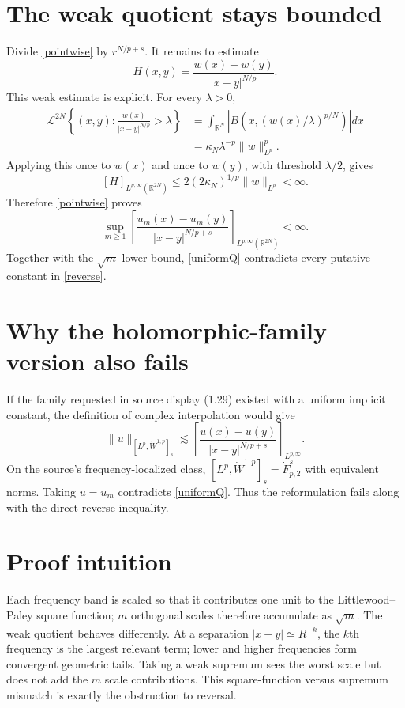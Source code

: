 \documentclass[11pt]{article}
\newcommand{\R}{\mathbb R}
\begin{document}
\section*{The weak quotient stays bounded}
Divide \eqref{pointwise} by $r^{N/p+s}$.  It remains to estimate
\[
 H(x,y)=\frac{w(x)+w(y)}{|x-y|^{N/p}}.
\]
This weak estimate is explicit.  For every $\lambda>0$,
\begin{align*}
 \mathcal L^{2N}\!\left\{(x,y):
       \frac{w(x)}{|x-y|^{N/p}}>\lambda\right\}
 &=\int_{\R^N}\left|B\!\left(x,
       (w(x)/\lambda)^{p/N}\right)\right|dx\\
 &=\kappa_N\lambda^{-p}\|w\|_{L^p}^p.
\end{align*}
Applying this once to $w(x)$ and once to $w(y)$, with threshold
$\lambda/2$, gives
\[
 [H]_{L^{p,\infty}(\R^{2N})}
 \le 2(2\kappa_N)^{1/p}\|w\|_{L^p}<\infty.
\]
Therefore \eqref{pointwise} proves
\begin{equation}\label{uniformQ}
 \sup_{m\ge1}
 \left[\frac{u_m(x)-u_m(y)}{|x-y|^{N/p+s}}
 \right]_{L^{p,\infty}(\R^{2N})}<\infty.
\end{equation}
Together with the $\sqrt m$ lower bound, \eqref{uniformQ} contradicts every
putative constant in \eqref{reverse}.

\section*{Why the holomorphic-family version also fails}
If the family requested in source display (1.29) existed with a uniform
implicit constant, the definition of complex interpolation would give
\[
 \|u\|_{[L^p,\dot W^{1,p}]_s}
 \lesssim
 \left[\frac{u(x)-u(y)}{|x-y|^{N/p+s}}
 \right]_{L^{p,\infty}}.
\]
On the source's frequency-localized class,
$[L^p,\dot W^{1,p}]_s=\dot F^s_{p,2}$ with equivalent norms.  Taking
$u=u_m$ contradicts \eqref{uniformQ}.  Thus the reformulation fails along
with the direct reverse inequality.

\clearpage
\section*{Proof intuition}
Each frequency band is scaled so that it contributes one unit to the
Littlewood--Paley square function; $m$ orthogonal scales therefore accumulate
as $\sqrt m$.  The weak quotient behaves differently.  At a separation
$|x-y|\simeq R^{-k}$, the $k$th frequency is the largest relevant term;
lower and higher frequencies form convergent geometric tails.  Taking a
weak supremum sees the worst scale but does not add the $m$ scale
contributions.  This square-function versus supremum mismatch is exactly the
obstruction to reversal.
\end{document}
